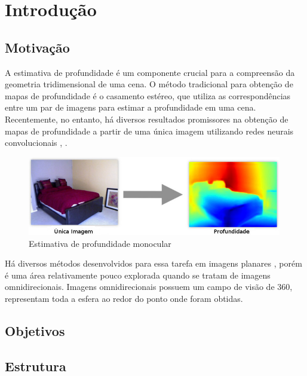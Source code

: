 \documentclass[cic,tc]{iiufrgs}
\begin{document}
\tableofcontents


\chapter{Introdução}

\section{Motivação}

A estimativa de profundidade é um componente crucial para a compreensão da geometria tridimensional de uma cena. O método tradicional para obtenção de mapas de profundidade é o casamento estéreo, que utiliza as correspondências entre um par de imagens para estimar a profundidade em uma cena. Recentemente, no entanto, há diversos resultados promissores na obtenção de mapas de profundidade a partir de uma única imagem utilizando redes neurais convolucionais \citep{Eigen2014}, \citep{Fayao2015}. 

\begin{figure}
    \caption{Estimativa de profundidade monocular}
    \begin{center}
        \includegraphics[width=30em]{monocular-depth.jpg}
    \end{center}
    \label{fig:monoDepth}
\end{figure}

Há diversos métodos desenvolvidos para essa tarefa em imagens planares , porém é uma área relativamente pouco explorada quando se tratam de imagens omnidirecionais. Imagens omnidirecionais possuem um campo de visão de 360\degree, representam toda a esfera ao redor do ponto onde foram obtidas.

\section{Objetivos}

\section{Estrutura}
\end{document}
